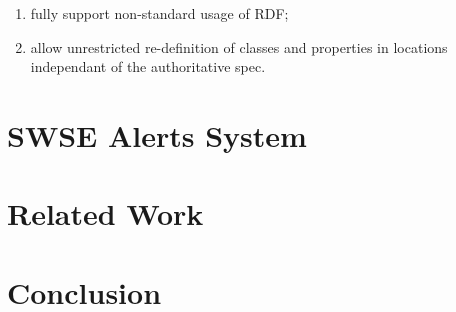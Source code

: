 \documentclass{llncs}
\begin{document}
\begin{enumerate}
\item fully support non-standard usage of RDF;
\item allow unrestricted re-definition of classes and properties in locations independant of the authoritative spec.
\end{enumerate}





\section{SWSE Alerts System}\label{sec:alerts}

\section{Related Work}\label{sec:related}

\section{Conclusion}\label{sec:conclude}

%



\end{document}
